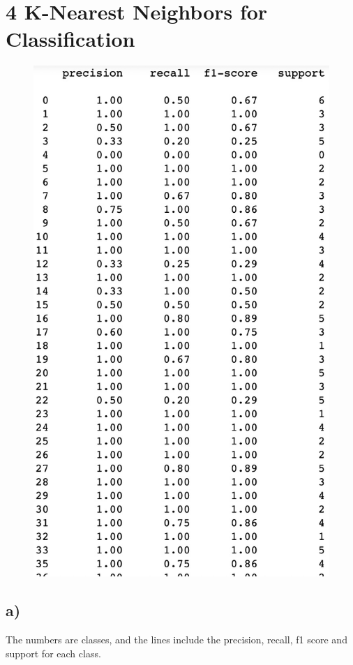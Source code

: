 \documentclass[12pt, letterpaper]{article}
\begin{document}
\section{4 K-Nearest Neighbors for Classification}
\begin{figure}[h!]
  \includegraphics[scale=0.33]{./images/4.jpg}
\end{figure}
\subsection*{a)} The numbers are classes, and the lines include the precision, recall, f1 score and support for each class.
\end{document}
